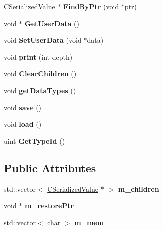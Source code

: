 \begin{DoxyCompactItemize}
\item 
\mbox{\label{class_c_serialized_value_ad48ee62b7f146e6cbbbe01a4307f10da}} 
\hyperlink{class_c_serialized_value}{C\+Serialized\+Value} $\ast$ {\bfseries Find\+By\+Ptr} (void $\ast$ptr)
\item 
\mbox{\label{class_c_serialized_value_a18a3f3e42a01f6812da163a0443092b3}} 
void $\ast$ {\bfseries Get\+User\+Data} ()
\item 
\mbox{\label{class_c_serialized_value_abffa48b34e94e7d7c6f29d72185404d6}} 
void {\bfseries Set\+User\+Data} (void $\ast$data)
\item 
\mbox{\label{class_c_serialized_value_a43d9be3d828efe8afaf244a2ba5986af}} 
void {\bfseries print} (int depth)
\item 
\mbox{\label{class_c_serialized_value_a77035394150be9192042026780edbf9e}} 
void {\bfseries Clear\+Children} ()
\item 
\mbox{\label{class_c_serialized_value_abd9e9b1cf226738a3232b394fb301357}} 
void {\bfseries get\+Data\+Types} ()
\item 
\mbox{\label{class_c_serialized_value_a0b34c2f8658a12cb23f29a78946767de}} 
void {\bfseries save} ()
\item 
\mbox{\label{class_c_serialized_value_a49120dfb32abbc788fd7d77d509e7063}} 
void {\bfseries load} ()
\item 
\mbox{\label{class_c_serialized_value_a92abe68f2284088295edcf120e5599f4}} 
uint {\bfseries Get\+Type\+Id} ()
\end{DoxyCompactItemize}
\subsection*{Public Attributes}
\begin{DoxyCompactItemize}
\item 
\mbox{\label{class_c_serialized_value_a25711cdf0f93825f511cd4024115449c}} 
std\+::vector$<$ \hyperlink{class_c_serialized_value}{C\+Serialized\+Value} $\ast$ $>$ {\bfseries m\+\_\+children}
\item 
\mbox{\label{class_c_serialized_value_a6577a549b2ba075038794b32a2142f2e}} 
void $\ast$ {\bfseries m\+\_\+restore\+Ptr}
\item 
\mbox{\label{class_c_serialized_value_a058401708f2e547d9bb18ff71650ca72}} 
std\+::vector$<$ char $>$ {\bfseries m\+\_\+mem}
\end{DoxyCompactItemize}
